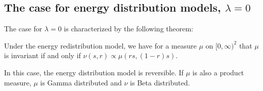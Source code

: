 \documentclass{article}
\begin{document}
\subsection{The case for energy distribution models\texorpdfstring{, $\lambda = 0$}{}}\label{statenergydist}
The case for $\lambda = 0$ is characterized by the following theorem:
\begin{theorem}\label{thm:invbetgam}
Under the energy redistribution model, we have for a measure $\mu$ on $[0, \infty)^2$ that
\(
\mu\)  is invariant if and only if
\(\nu(s, r) \propto \mu(rs, (1-r)s) %
\).

In this case, the energy distribution model is reversible. If $\mu$ is also a product measure, $\mu$ is Gamma distributed and $\nu$ is Beta distributed.
\end{theorem}
\end{document}
